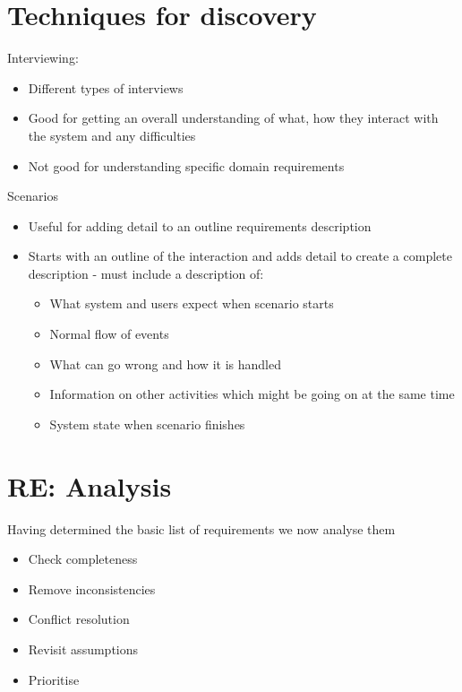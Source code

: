 \documentclass{article}[18pt]
\begin{document}
\section{Techniques for discovery}
Interviewing:
\begin{itemize}
	\item Different types of interviews
	\item Good for getting an overall understanding of what, how they interact with the system and any difficulties
	\item Not good for understanding specific domain requirements
\end{itemize}
Scenarios
\begin{itemize}
	\item Useful for adding detail to an outline requirements description
	\item Starts with an outline of the interaction and adds detail to create a complete description - must include a description of:
	\begin{itemize}
		\item What system and users expect when scenario starts
		\item Normal flow of events
		\item What can go wrong and how it is handled
		\item Information on other activities which might be going on at the same time
		\item System state when scenario finishes
	\end{itemize}
\end{itemize}
\section{RE: Analysis}
Having determined the basic list of requirements we now analyse them
\begin{itemize}
	\item Check completeness
	\item Remove inconsistencies
	\item Conflict resolution
	\item Revisit assumptions
	\item Prioritise
\end{itemize}
\end{document}
